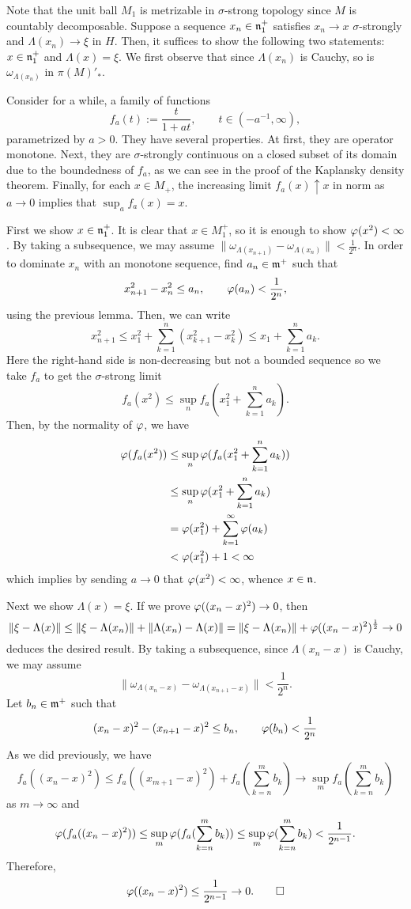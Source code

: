 \documentclass{../../small}
\begin{document}
\begin{pf}
Note that the unit ball $M_1$ is metrizable in $\sigma$-strong topology since $M$ is countably decomposable.
Suppose a sequence $x_n\in\mathfrak{n}^+_1$ satisfies $x_n\to x$ $\sigma$-strongly and $\Lambda(x_n)\to\xi$ in $H$.
Then, it suffices to show the following two statements: $x\in\mathfrak{n}^+_1$ and $\Lambda(x)=\xi$.
We first observe that since $\Lambda(x_n)$ is Cauchy, so is $\omega_{\Lambda(x_n)}$ in $\pi(M)'_*$.

Consider for a while, a family of functions
\[f_a(t):=\frac t{1+at},\qquad t\in(-a^{-1},\infty),\]
parametrized by $a>0$.
They have several properties.
At first, they are operator monotone.
Next, they are $\sigma$-strongly continuous on a closed subset of its domain due to the boundedness of $f_a$, as we can see in the proof of the Kaplansky density theorem.
Finally, for each $x\in M_+$, the increasing limit $f_a(x)\uparrow x$ in norm as $a\to0$ implies that $\sup_af_a(x)=x$.

First we show $x\in\mathfrak{n}^+_1$.
It is clear that $x\in M^+_1$, so it is enough to show $\varphi(x^2)<\infty$.
By taking a subsequence, we may assume $\|\omega_{\Lambda(x_{n+1})}-\omega_{\Lambda(x_n)}\|<\frac1{2^n}$.
In order to dominate $x_n$ with an monotone sequence, find $a_n\in\mathfrak{m}^+$ such that
\[x_{n+1}^2-x_n^2\le a_n,\qquad \varphi(a_n)<\frac1{2^n},\]
using the previous lemma.
Then, we can write
\[x_{n+1}^2\le x_1^2+\sum_{k=1}^n(x_{k+1}^2-x_k^2)\le x_1+\sum_{k=1}^na_k.\]
Here the right-hand side is non-decreasing but not a bounded sequence so we take $f_a$ to get the $\sigma$-strong limit
\[f_a(x^2)\le\sup_nf_a(x_1^2+\sum_{k=1}^na_k).\]
Then, by the normality of $\varphi$, we have
\begin{align*}
\varphi(f_a(x^2))
&\le\sup_n\varphi(f_a(x_1^2+\sum_{k=1}^na_k))\\
&\le\sup_n\varphi(x_1^2+\sum_{k=1}^na_k)\\
&=\varphi(x_1^2)+\sum_{k=1}^\infty\varphi(a_k)\\
&<\varphi(x_1^2)+1<\infty
\end{align*}
which implies by sending $a\to0$ that $\varphi(x^2)<\infty$, whence $x\in\mathfrak{n}$.

Next we show $\Lambda(x)=\xi$.
If we prove $\varphi((x_n-x)^2)\to0$, then
\[\|\xi-\Lambda(x)\|\le\|\xi-\Lambda(x_n)\|+\|\Lambda(x_n)-\Lambda(x)\|=\|\xi-\Lambda(x_n)\|+\varphi((x_n-x)^2)^{\frac12}\to0\]
deduces the desired result.
By taking a subsequence, since $\Lambda(x_n-x)$ is Cauchy, we may assume
\[\|\omega_{\Lambda(x_n-x)}-\omega_{\Lambda(x_{n+1}-x)}\|<\frac1{2^n}.\]
Let $b_n\in\mathfrak{m}^+$ such that
\[(x_n-x)^2-(x_{n+1}-x)^2\le b_n,\qquad\varphi(b_n)<\frac1{2^n}\]
As we did previously, we have
\[f_a((x_n-x)^2)\le f_a((x_{m+1}-x)^2)+f_a(\sum_{k=n}^mb_k)\to\sup_mf_a(\sum_{k=n}^mb_k)\]
as $m\to\infty$ and
\[\varphi(f_a((x_n-x)^2))
\le\sup_m\varphi(f_a(\sum_{k=n}^mb_k))
\le\sup_m\varphi(\sum_{k=n}^mb_k)<\frac1{2^{n-1}}.\]
Therefore,
\[\varphi((x_n-x)^2)\le\frac1{2^{n-1}}\to0.\qedhere\]
\end{pf}
\end{document}
